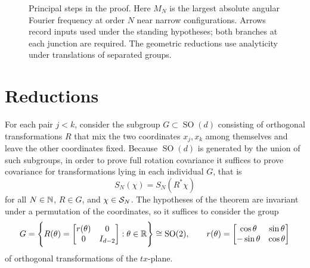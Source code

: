 \begin{figure}[p]
\par\smallskip
\FlowLegend
\caption{Principal steps in the proof. Here $M_N$ is the largest absolute
angular Fourier frequency at order $N$ near narrow configurations.
Arrows record inputs used under the standing hypotheses; both branches
at each junction are required. The geometric reductions use analyticity
under translations of separated groups.}
\label{fig:proof-overview}
\end{figure}
\clearpage

\section{Reductions}


For each pair $j<k$, consider the subgroup $G\subset \operatorname{SO}(d)$ consisting of orthogonal transformations $R$ that mix the two coordinates $x_j,x_k$ among themselves and leave the other coordinates fixed.
Because $\operatorname{SO}(d)$ is generated by the union of such subgroups, in order to prove full rotation covariance it suffices to prove covariance for transformations lying in each individual $G$, that is
\begin{equation}
    S_N(\chi) = S_N(R^* \chi )
\end{equation}
for all $N\in \mathbb{N}$, $R\in G$, and $\chi\in \mathcal{S}_N$. 
The hypotheses of the theorem are invariant under a permutation of the coordinates, so it suffices to consider the group
\begin{equation}
    G=\Bigg\{  R(\theta) =\begin{bmatrix} 
    r(\theta) & 0 \\
     0 & I_{d-2} 
    \end{bmatrix}  : \theta\in \mathbb{R}
    \Bigg\} \cong \operatorname{SO}(2),\qquad  r(\theta) = 
    \begin{bmatrix}
        \cos \theta & \sin \theta \\ 
        -\sin \theta & \cos \theta 
    \end{bmatrix}
\end{equation}
of orthogonal transformations of the $tx$-plane. 

